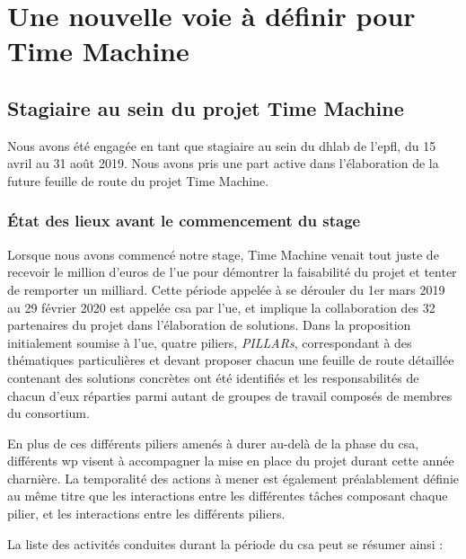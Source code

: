 \part{Une nouvelle voie à définir pour Time Machine}

\chapter{Stagiaire au sein du projet Time Machine}

Nous avons été engagée en tant que stagiaire au sein du \gls{dhlab} de l'\gls{epfl}, du 15 avril au 31 août 2019. Nous avons pris une part active dans l'élaboration de la future feuille de route du projet Time Machine.

\section{État des lieux avant le commencement du stage}
Lorsque nous avons commencé notre stage, Time Machine venait tout juste de recevoir le million d'euros de l'\gls{ue} pour démontrer la faisabilité du projet et tenter de remporter un milliard. Cette période appelée à se dérouler du 1er mars 2019 au 29 février 2020 est appelée \gls{csa} par l'\gls{ue}, et implique la collaboration des 32 partenaires du projet dans l'élaboration de solutions. Dans la proposition initialement soumise à l'\gls{ue}, quatre piliers, \textit{PILLARs}, correspondant à des thématiques particulières et devant proposer chacun une feuille de route détaillée contenant des solutions concrètes ont été identifiés et les responsabilités de chacun d'eux réparties parmi autant de groupes de travail composés de membres du consortium. 

En plus de ces différents piliers amenés à durer au-delà de la phase du \gls{csa}, différents \gls{wp} visent à accompagner la mise en place du projet durant cette année charnière. La temporalité des actions à mener est également préalablement définie au même titre que les interactions entre les différentes tâches composant chaque pilier, et les interactions entre les différents piliers. 

La liste des activités conduites durant la période du \gls{csa} peut se résumer ainsi :

